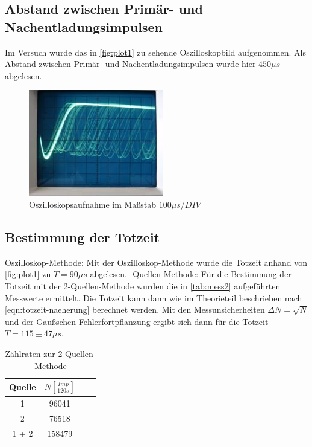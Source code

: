 \subsection{Abstand zwischen Primär- und Nachentladungsimpulsen}
Im Versuch wurde das in \autoref{fig:plot1} zu sehende Oszilloskopbild aufgenommen. Als Abstand zwischen Primär- und Nachentladungsimpulsen wurde hier $450 \mu s$ abgelesen.
\begin{figure}
  \centering
  \includegraphics{content/oszill.JPG}
  \caption{Oszilloskopsaufnahme im Maßstab $100\mu s/DIV$ \cite{sample}}
  \label{fig:plot1}
\end{figure}

\subsection{Bestimmung der Totzeit}
Oszilloskop-Methode:
Mit der Oszilloskop-Methode wurde die Totzeit anhand von \autoref{fig:plot1} zu $T=90 \mu s$ abgelesen.
\newline
{}-Quellen Methode:
Für die Bestimmung der Totzeit mit der 2-Quellen-Methode wurden die in \autoref{tab:mess2} aufgeführten Messwerte ermittelt. Die Totzeit kann dann wie im Theorieteil beschrieben nach \autoref{eqn:totzeit-naeherung} berechnet werden. Mit den Messunsicherheiten $\Delta N = \sqrt{N}$ und der Gaußschen Fehlerfortpflanzung ergibt sich dann für die Totzeit $T=115 \pm 47 \mu s$.
\begin{table}
  \centering
  \caption{Zählraten zur 2-Quellen-Methode}
\label{tab:mess2}
  \begin{tabular}{c c c c}
  \toprule
  Quelle & $N [\frac{Imp}{120s}]$ \\
  \midrule
  1     & 96041  \\
  2     & 76518 \\
  1 + 2 & 158479 \\
  \bottomrule
  \end{tabular}
  \end{table}
  \newpage
